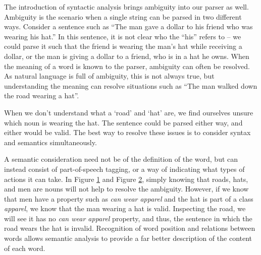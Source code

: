 The introduction of syntactic analysis brings ambiguity into our parser as well. Ambiguity is the scenario when a single string can be parsed in two different ways. Consider a sentence such as ``The man gave a dollar to his friend who was wearing his hat.'' In this sentence, it is not clear who the ``his'' refers to -- we could parse it such that the friend is wearing the man's hat while receiving a dollar, or the man is giving a dollar to a friend, who is in a hat he owns. When the meaning of a word is known to the parser, ambiguity can often be resolved. As natural language is full of ambiguity, this is not always true, but understanding the meaning can resolve situations such as ``The man walked down the road wearing a hat''.

\begin{figure}[!ht]
\centering

  \centering
  \label{fig:wrong}
\end{figure}
\begin{figure}[!ht]

  \centering
\label{fig:right}

\end{figure}

When we don't understand what a `road' and `hat' are, we find ourselves unsure which noun is wearing the hat. The sentence could be parsed either way, and either would be valid. The best way to resolve these issues is to consider syntax and semantics simultaneously.

A semantic consideration need not be of the definition of the word, but can instead consist of part-of-speech tagging, or a way of indicating what types of actions it can take. In Figure \ref{fig:wrong} and Figure \ref{fig:right}, simply knowing that roads, hats, and men are nouns will not help to resolve the ambiguity. However, if we know that men have a property such as \textit{can wear apparel} and the hat is part of a class \textit{apparel}, we know that the man wearing a hat is valid. Inspecting the road, we will see it has no \textit{can wear apparel} property, and thus, the sentence in which the road wears the hat is invalid. Recognition of word position and relations between words allows semantic analysis to provide a far better description of the content of each word.

